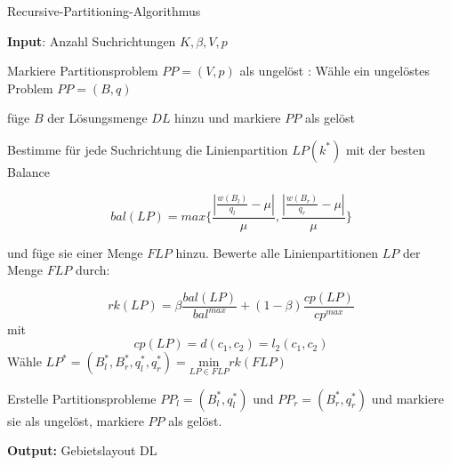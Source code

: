       \begin{algorithm}
        \caption{Recursive-Partitioning-Algorithmus}\label{Recursive-Partitioning-Algorithmus}
        \textbf{Input}: Anzahl Suchrichtungen $K, \beta, V, p$
        \begin{algorithmic}[1]
          \State Markiere Partitionsproblem $PP = (V, p)$ als ungelöst
          :
            \State Wähle ein ungelöstes Problem $PP = (B, q)$
            
              \State füge $B$ der Lösungsmenge $DL$ hinzu und markiere $PP$ als gelöst
            \EndIf

              \State Bestimme für jede Suchrichtung die Linienpartition $LP(k^*)$ mit der besten Balance

              $$bal(LP) = max\{\frac{|\frac{w(B_l)}{q_l} - \mu|}{\mu}, \frac{|\frac{w(B_r)}{q_r} - \mu|}{\mu}\}$$

              und füge sie einer Menge $FLP$ hinzu.
              \State Bewerte alle Linienpartitionen $LP$ der Menge $FLP$ durch:
              
                \begin{equation*}
                  rk(LP) = \beta\frac{bal(LP)}{bal^{max}} + (1 - \beta)\frac{cp(LP)}{cp^{max}}
                \end{equation*}
              mit 
              $$cp(LP) = d(c_1, c_2) = l_2(c_1, c_2)$$
              \State Wähle $LP^{*} = (B_{l}^{*}, B_{r}^{*}, q_{l}^{*}, q_{r}^{*}) = \underset{LP \in FLP}{\text{min}}rk(FLP)$ 

              \State Erstelle Partitionsprobleme $PP_l = (B_{l}^{*}, q_{l}^{*})$ und $PP_r = (B_{r}^{*}, q_{r}^{*})$ und markiere sie als ungelöst, markiere $PP$ als gelöst.
            \EndIf
          \EndWhile
        \end{algorithmic}
        \textbf{Output:} Gebietslayout DL
      \end{algorithm}


    
        
       






    


